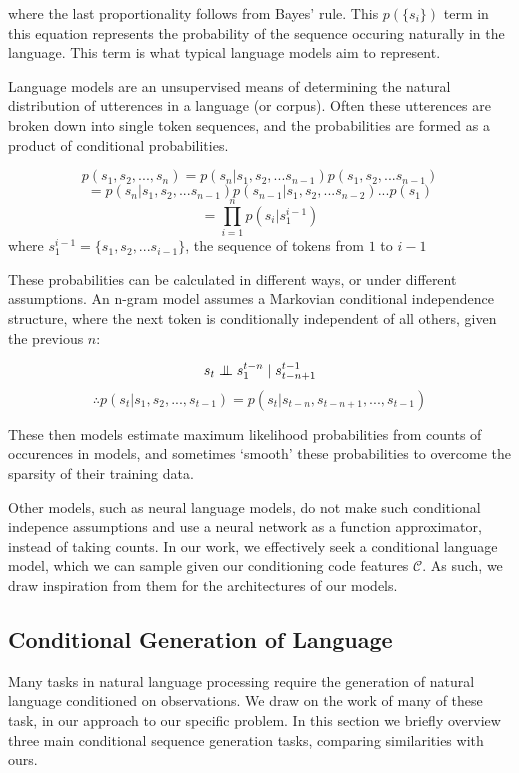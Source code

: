 where the last proportionality follows from Bayes' rule.
This $p(\{s_i\})$ term in this equation represents the probability of the sequence occuring naturally in the language. This term is what typical language models aim to represent.

Language models are an unsupervised means of determining the natural distribution of utterences in a language (or corpus). 
Often these utterences are broken down into single token sequences, and the probabilities are formed as a product of conditional probabilities.

$$p(s_1, s_2,...,s_n ) = p(s_n | s_1, s_2,...s_{n-1} )  p(s_1, s_2,...s_{n-1} )$$
$$= p(s_n | s_1, s_2,...s_{n-1} ) p(s_{n-1} | s_1, s_2,...s_{n-2} )...p(s_1)$$
$$ = \prod_{i=1}^{n} p(s_i | s_1^{i-1} ) $$ where $s_1^{i-1} =  \{s_1, s_2,...s_{i-1}\}$, the sequence of tokens from $1$ to $i-1$

These probabilities can be calculated in different ways, or under different assumptions. An n-gram model assumes a Markovian conditional independence structure, where the next token is conditionally independent of all others, given the previous $n$: 

$$ s_t \mathrel{\perp\mspace{-10mu}\perp} s_1^{t-n} \mid s^{t-1}_{t-n+1} $$
$$\therefore p(s_t | s_1, s_2,..., s_{t-1} )  = p(s_t | s_{t-n}, s_{t-n+1},..., s_{t-1}  ) $$

These then models estimate maximum likelihood probabilities from counts of occurences in models, and sometimes `smooth' these probabilities to overcome the sparsity of their training data.

Other models, such as neural language models, do not make such conditional indepence assumptions and use a neural network as a function approximator, instead of taking counts.
In our work, we effectively seek a conditional language model, which we can sample given our conditioning code features $\mathcal{C}$. As such, we draw inspiration from them for the architectures of our models.

\subsection{Conditional Generation of Language}

Many tasks in natural language processing require the generation of natural language conditioned on observations.
We draw on the work of many of these task, in our approach to our specific problem.
In this section we briefly overview three main conditional sequence generation tasks, comparing similarities with ours.

